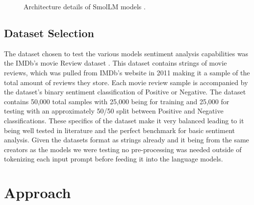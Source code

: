 \documentclass[10pt,twocolumn,letterpaper]{article}
\begin{document}
\begin{figure}[t]
\begin{center}
\end{center}
   \caption{Architecture details of SmolLM models \cite{hf-smollm-usecase}.}
\label{fig:smollm-parameteres}
\end{figure}


\subsection{Dataset Selection}
The dataset chosen to test the various models sentiment analysis capabilities was the IMDb's movie Review dataset \cite{IMDB-dataset}. This dataset contains strings of movie reviews, which was pulled from IMDb's website in 2011 making it a sample of the total amount of reviews they store. Each movie review sample is accompanied by the dataset's binary sentiment classification of Positive or Negative. The dataset contains 50,000 total samples with 25,000 being for training and 25,000 for testing with an approximately 50/50 split between Positive and Negative classifications. These specifics of the dataset make it very balanced leading to it being well tested in literature and the perfect benchmark for basic sentiment analysis. Given the datasets format as strings already and it being from the same creators as the models we were testing no pre-processing was needed outside of tokenizing each input prompt before feeding it into the language models. 




\section{Approach}

\end{document}
